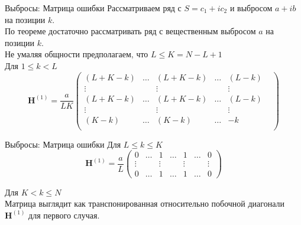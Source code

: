 \documentclass[ucs, notheorems, handout]{beamer}
\begin{document}
\begin{frame}{Выбросы: Матрица ошибки}
    Рассматриваем ряд с $S = c_1 + ic_2$ и выбросом $a + ib$ на позиции $k$.\\
    По теореме достаточно рассматривать ряд с вещественным выбросом $a$ на позиции $k$.\\
    \vspace{1em}
    Не умаляя общности предполагаем, что $L \leq K = N - L + 1$\\
    \vspace{1em}
    Для $1 \leq k < L$
    $$\mathbf{H}^{(1)} = \frac{a}{LK}\begin{pmatrix}
	(L + K - k) & \ldots & (L + K - k) & \ldots & (L - k)\\
	\vdots & & \vdots & & \vdots \\
	(L + K - k) & \ldots & (L + K - k) & \ldots & (L - k) & \\
	\vdots & & \vdots & & \vdots \\
	(K - k) & \ldots & (K - k) & \ldots & -k \\
\end{pmatrix}$$
\end{frame}

\begin{frame}{Выбросы: Матрица ошибки}
    Для $L \leq k \leq K$
    $$\mathbf{H}^{(1)} = \frac{a}{L}\begin{pmatrix}
	0 & \ldots & 1 & \ldots & 1 & \ldots & 0\\
	\vdots & & \vdots & & \vdots & & \vdots\\
	0 & \ldots & 1 & \ldots & 1 & \ldots & 0
    \end{pmatrix}$$
    
    Для $K < k \leq N$\\
    \vspace{1em}
    Матрица выглядит как транспонированная относительно побочной диагонали $\mathbf{H}^{(1)}$ для первого случая.\\
    \vspace{1em}
\end{frame}
\end{document}
